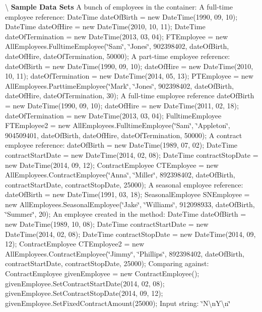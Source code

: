 \textbackslash{} {\bfseries  Sample Data Sets} A bunch of employees in the container\+: A full-\/time employee reference\+: Date\+Time date\+Of\+Birth = new Date\+Time(1990, 09, 10); Date\+Time date\+Of\+Hire = new Date\+Time(2010, 10, 11); Date\+Time date\+Of\+Termination = new Date\+Time(2013, 03, 04); F\+T\+Employee = new All\+Employees.\+Fulltime\+Employee(\char`\"{}\+Sam\char`\"{}, \char`\"{}\+Jones\char`\"{}, 902398402, date\+Of\+Birth, date\+Of\+Hire, date\+Of\+Termination, 50000); A part-\/time employee reference\+: date\+Of\+Birth = new Date\+Time(1990, 09, 10); date\+Of\+Hire = new Date\+Time(2010, 10, 11); date\+Of\+Termination = new Date\+Time(2014, 05, 13); P\+T\+Employee = new All\+Employees.\+Parttime\+Employee(\char`\"{}\+Mark\char`\"{}, \char`\"{}\+Jones\char`\"{}, 902398402, date\+Of\+Birth, date\+Of\+Hire, date\+Of\+Termination, 30); A full-\/time employee reference date\+Of\+Birth = new Date\+Time(1990, 09, 10); date\+Of\+Hire = new Date\+Time(2011, 02, 18); date\+Of\+Termination = new Date\+Time(2013, 03, 04); Fulltime\+Employee F\+T\+Employee2 = new All\+Employees.\+Fulltime\+Employee(\char`\"{}\+Sam\char`\"{}, \char`\"{}\+Appleton\char`\"{}, 904509401, date\+Of\+Birth, date\+Of\+Hire, date\+Of\+Termination, 50000); A contract employee reference\+: date\+Of\+Birth = new Date\+Time(1989, 07, 02); Date\+Time contract\+Start\+Date = new Date\+Time(2014, 02, 08); Date\+Time contract\+Stop\+Date = new Date\+Time(2014, 09, 12); Contract\+Employee C\+T\+Employee = new All\+Employees.\+Contract\+Employee(\char`\"{}\+Anna\char`\"{}, \char`\"{}\+Miller\char`\"{}, 892398402, date\+Of\+Birth, contract\+Start\+Date, contract\+Stop\+Date, 25000); A seasonal employee reference\+: date\+Of\+Birth = new Date\+Time(1991, 03, 18); Seasonal\+Employee S\+N\+Employee = new All\+Employees.\+Seasonal\+Employee(\char`\"{}\+Jake\char`\"{}, \char`\"{}\+Williams\char`\"{}, 912098933, date\+Of\+Birth, \char`\"{}\+Summer\char`\"{}, 20); An employee created in the method\+: Date\+Time date\+Of\+Birth = new Date\+Time(1989, 10, 08); Date\+Time contract\+Start\+Date = new Date\+Time(2014, 02, 08); Date\+Time contract\+Stop\+Date = new Date\+Time(2014, 09, 12); Contract\+Employee C\+T\+Employee2 = new All\+Employees.\+Contract\+Employee(\char`\"{}\+Jimmy\char`\"{}, \char`\"{}\+Phillips\char`\"{}, 892398402, date\+Of\+Birth, contract\+Start\+Date, contract\+Stop\+Date, 25000); Comparing against\+: Contract\+Employee given\+Employee = new Contract\+Employee(); given\+Employee.\+Set\+Contract\+Start\+Date(2014, 02, 08); given\+Employee.\+Set\+Contract\+Stop\+Date(2014, 09, 12); given\+Employee.\+Set\+Fixed\+Contract\+Amount(25000); Input string\+: \char`\"{}\+N\textbackslash{}n\+Y\textbackslash{}n\char`\"{}

